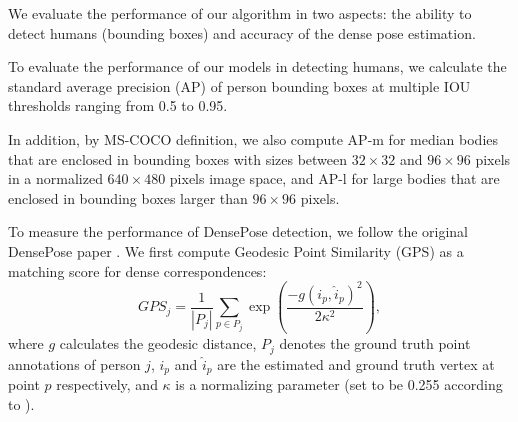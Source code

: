 \documentclass[sigconf, anonymous=false]{acmart}
\newcommand{\dong}[1]{\textcolor{green}{[Dong: #1]}}
\begin{document}
We evaluate the performance of our algorithm in two aspects: the ability to detect humans (bounding boxes)
and accuracy of the dense pose estimation. 

To evaluate the performance of our models in detecting humans, we calculate the standard average precision (AP) of person bounding boxes at multiple IOU thresholds ranging from 0.5 to 0.95.  




In addition, by MS-COCO \cite{coco} definition, we also compute AP-m for median bodies that are enclosed in bounding boxes with sizes between $32 \times 32$ and $96 \times 96$ pixels in a normalized $640 \times 480$ pixels image space, and AP-l for large bodies that are enclosed in bounding boxes larger than $96 \times 96$ pixels.



To measure the performance of DensePose detection, we follow the original DensePose paper \cite{DensePose}. We first compute Geodesic Point Similarity (GPS) as a matching score for dense correspondences:
\begin{equation}
GPS_j = \frac{1}{|P_j|}\sum_{p \in P_j}\exp(\frac{-g(i_p, \hat{i}_p)^2}{2\kappa^2}),
\end{equation}
where $g$ calculates the geodesic distance, $P_j$ denotes the ground truth point annotations of person $j$, $i_p$ and $\hat{i}_p$ are the estimated and ground truth vertex at point $p$ respectively, and $\kappa$ is a normalizing parameter (set to be 0.255 according to \cite{DensePose}). 
\end{document}
